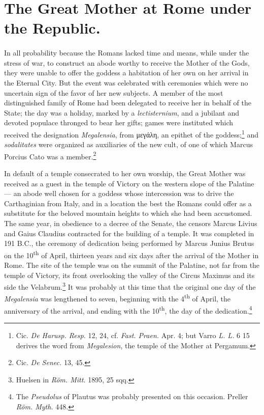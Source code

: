\documentclass[a4paper, 11pt, oneside, polutonikogreek, english]{article}
\begin{document}
\section{The Great Mother at Rome under the Republic.}
\paragraph{}
In all probability because the Romans lacked time and means, while under the stress of war, to construct an abode worthy to receive the Mother of the Gods, they were unable to offer the goddess a habitation of her own on her arrival in the Eternal City. But the event was celebrated with ceremonies which were no uncertain sign of the favor of her new subjects. A member of the most distinguished family of Rome had been delegated to receive her in behalf of the State; the day was a holiday, marked by a \emph{lectisternium}, and a jubilant and devoted populace thronged to bear her gifts; games were instituted which received the designation \emph{Megalensia}, from μεγάλη, an epithet of the goddess;\footnote{Cic. \emph{De Harusp. Resp.} 12, 24, cf. \emph{Fast. Praen.} Apr. 4; but Varro \emph{L. L.} 6 15 derives the word from \emph{Megalesion}, the temple of the Mother at Pergamum.} and \emph{sodalitates} were organized as auxiliaries of the new cult, of one of which Marcus Porcius Cato was a member.\footnote{Cic. \emph{De Senec.} 13, 45.}

In default of a temple consecrated to her own worship, the Great Mother was received as a guest in the temple of Victory on the western slope of the Palatine --- an abode well chosen for a goddess whose intercession was to drive the Carthaginian from Italy, and in a location the best the Romans could offer as a substitute for the beloved mountain heights to which she had been accustomed. The same year, in obedience to a decree of the Senate, the censors Marcus Livius and Gaius Claudius contracted for the building of a temple. It was completed in 191 \textsc{B.C.}, the ceremony of dedication being performed by Marcus Junius Brutus on the 10\textsuperscript{th} of April, thirteen years and six days after the arrival of the Mother in Rome. The site of the temple was on the summit of the Palatine, not far from the temple of Victory, its front overlooking the valley of the Circus Maximus and its side the Velabrum.\footnote{Huelsen in \emph{Röm. Mitt.} 1895, 25 sqq.} It was probably at this time that the original one day of the \emph{Megalensia} was lengthened to seven, beginning with the 4\textsuperscript{th} of April, the anniversary of the arrival, and ending with the 10\textsuperscript{th}, the day of the dedication.\footnote{The \emph{Pseudolus} of Plautus was probably presented on this occasion. Preller \emph{Röm. Myth.} 448.}
\end{document}
